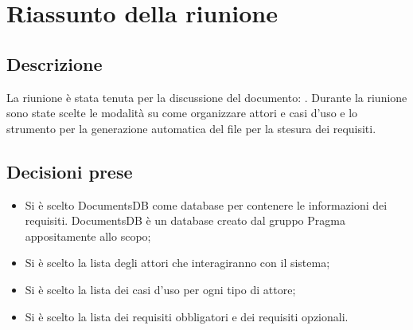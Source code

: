 \section{Riassunto della riunione}
\subsection{Descrizione}

La riunione è stata tenuta per la discussione del documento: \AdR. Durante la riunione sono state scelte le modalità su come organizzare attori e casi d'uso e lo strumento per la generazione automatica del file \textit{\LaTex {}} per la stesura dei requisiti.

\subsection{Decisioni prese}
\begin{itemize}
\item Si è scelto DocumentsDB come database per contenere le informazioni dei requisiti. DocumentsDB è un database creato dal gruppo Pragma appositamente allo scopo;
\item Si è scelto la lista degli attori che interagiranno con il sistema;
\item Si è scelto la lista dei casi d'uso per ogni tipo di attore;
\item Si è scelto la lista dei requisiti obbligatori e dei requisiti opzionali.
\end{itemize}